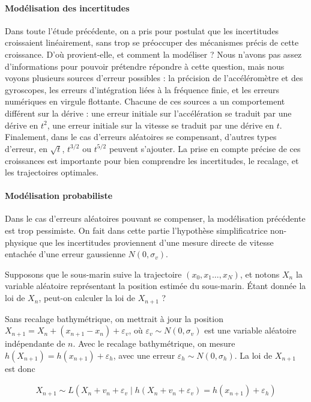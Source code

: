 \paragraph{Modélisation des incertitudes}
Dans toute l'étude précédente, on a pris pour postulat que les
incertitudes croissaient linéairement, sans trop se préoccuper des
mécanismes précis de cette croissance. D'où provient-elle, et comment
la modéliser ? Nous n'avons pas assez d'informations pour pouvoir
prétendre répondre à cette question, mais nous voyons plusieurs
sources d'erreur possibles : la précision de l'accéléromètre et des
gyroscopes, les erreurs d'intégration liées à la fréquence finie, et
les erreurs numériques en virgule flottante. Chacune de ces sources a
un comportement différent sur la dérive : une erreur initiale sur
l'accélération se traduit par une dérive en $t^{2}$, une erreur
initiale sur la vitesse se traduit par une dérive en $t$. Finalement,
dans le cas d'erreurs aléatoires se compensant, d'autres types
d'erreur, en $\sqrt t$, $t^{3/2}$ ou $t^{5/2}$ peuvent s'ajouter. La
prise en compte précise de ces croissances est importante pour bien
comprendre les incertitudes, le recalage, et les trajectoires
optimales.
\paragraph{Modélisation probabiliste}
Dans le cas d'erreurs aléatoires pouvant se compenser, la modélisation
précédente est trop pessimiste. On fait dans cette partie l'hypothèse
simplificatrice non-physique que les incertitudes proviennent d'une
mesure directe de vitesse entachée d'une erreur gaussienne
$N(0, \sigma_{v})$.

Supposons que le sous-marin suive la trajectoire $(x_{0}, x_{1} \dots,
x_{N})$, et notons $X_{n}$ la variable aléatoire représentant la
position estimée du sous-marin. Étant donnée la loi de $X_{n}$,
peut-on calculer la loi de $X_{n+1}$ ?

Sans recalage bathymétrique, on mettrait à jour la position
$X_{n + 1} = X_{n} + (x_{n+1} - x_{n}) + \varepsilon_{v}$, où
$\varepsilon_{v} \sim N(0, \sigma_{v})$ est une variable aléatoire
indépendante de $n$. Avec le recalage bathymétrique, on mesure
$h(X_{n+1}) = h(x_{n+1}) + \varepsilon_{h}$, avec une erreur
$\varepsilon_{h} \sim N(0, \sigma_{h})$. La loi de $X_{n+1}$ est donc 

  \begin{align*}
    X_{n+1} \sim L(X_{n} + v_{n} + \varepsilon_{v} \;\Big|\;
    h(X_{n} + v_{n} + \varepsilon_{v}) = h(x_{n+1}) + \varepsilon_{h})
  \end{align*}

